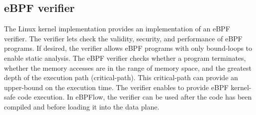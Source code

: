 



\subsection{eBPF verifier}
The Linux kernel implementation provides an implementation of an eBPF verifier.
The verifier lets check the validity, security, and performance of eBPF programs.
If desired, the verifier allows eBPF programs with only bound-loops to enable static analysis.
The eBPF verifier checks whether a program terminates, whether the memory accesses are in the range of memory space, and the greatest depth of the execution path (critical-path).
This critical-path can provide an upper-bound on the execution time.
The verifier enables to provide eBPF kernel-safe code execution.
In eBPFlow, the verifier can be used after the code has been compiled and before loading it into the data plane.

